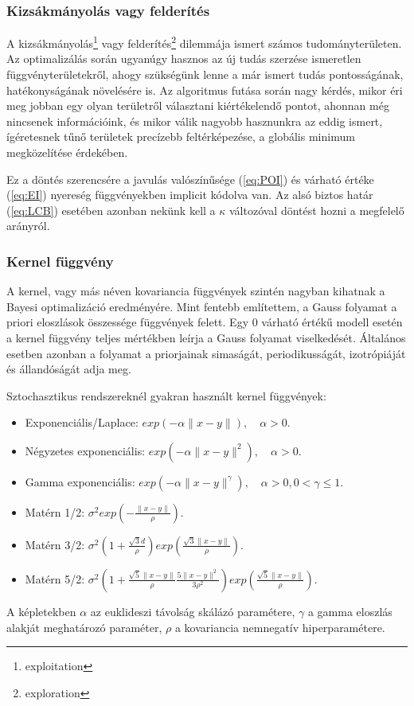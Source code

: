 \subsubsection{Kizsákmányolás vagy felderítés}
A kizsákmányolás\footnote{exploitation} vagy felderítés\footnote{exploration} dilemmája ismert számos tudományterületen. Az optimalizálás során ugyanúgy hasznos az új tudás szerzése ismeretlen függvényterületekről, ahogy szükségünk lenne a már ismert tudás pontosságának, hatékonyságának növelésére is. Az algoritmus futása során nagy kérdés, mikor éri meg jobban egy olyan területről választani kiértékelendő pontot, ahonnan még nincsenek információink, és mikor válik nagyobb hasznunkra az eddig ismert, ígéretesnek tűnő területek precízebb feltérképezése, a globális minimum megközelítése érdekében.

Ez a döntés szerencsére a javulás valószínűsége (\ref{eq:POI}) és várható értéke (\ref{eq:EI}) nyereség függvényekben implicit kódolva van. Az alsó biztos határ (\ref{eq:LCB}) esetében azonban nekünk kell a $\kappa$ változóval döntést hozni a megfelelő arányról.

\subsubsection{Kernel függvény}
A kernel, vagy más néven kovariancia függvények szintén nagyban kihatnak a Bayesi optimalizáció eredményére. Mint fentebb említettem, a Gauss folyamat a priori eloszlások összessége függvények felett.
Egy 0 várható értékű modell esetén a kernel függvény teljes mértékben leírja a Gauss folyamat viselkedését.
Általános esetben azonban a folyamat a priorjainak simaságát, periodikusságát, izotrópiáját és állandóságát adja meg.

Sztochasztikus rendszereknél gyakran használt kernel függvények:
\begin{itemize}
	\item Exponenciális/Laplace: $exp(-\alpha\|x-y\|), \quad \alpha>0$.
	\item Négyzetes exponenciális: $exp(-\alpha\|x-y\|^2), \quad \alpha>0$.
	\item Gamma exponenciális: $exp(-\alpha\|x-y\|^\gamma), \quad \alpha>0, 0<\gamma\le1$.
	\item Matérn 1/2: $\sigma^2exp\left( -\frac{\|x-y\|}{\rho}\right)$. 
	\item Matérn 3/2: $\sigma^2\left( 1+\frac{\sqrt{3}d}{\rho}\right) exp\left(\frac{\sqrt{3}\|x-y\|}{\rho}\right)$.
	\item Matérn 5/2: $\sigma^2\left( 1+\frac{\sqrt{5}\|x-y\|}{\rho}\frac{5\|x-y\|^2}{3\rho^2}\right) exp\left(\frac{\sqrt{5}\|x-y\|}{\rho}\right)$.
\end{itemize}
A képletekben $\alpha$ az euklideszi távolság skálázó paramétere, $\gamma$ a gamma eloszlás alakját meghatározó paraméter, $\rho$ a kovariancia nemnegatív hiperparamétere.\\

